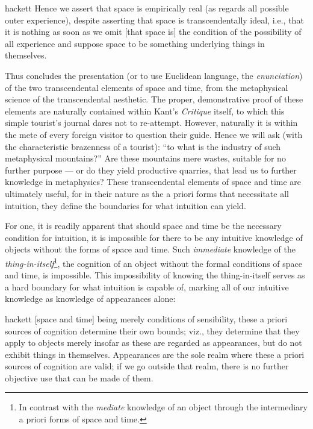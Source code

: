 \begin{displaycquote}[B45]{hackett}
Hence we assert that space is empirically real (as regards all possible outer experience), despite asserting that space is transcendentally ideal, i.e., that it is nothing as soon as we omit [that space is] the condition of the possibility of all experience and suppose space to be something underlying things in themselves.
\end{displaycquote}

Thus concludes the presentation (or to use Euclidean language, the \emph{enunciation}) of the two transcendental elements of space and time, from the metaphysical science of the transcendental aesthetic. The proper, demonstrative proof of these elements are naturally contained within Kant's \emph{Critique} itself, to which this simple tourist's journal dares not to re-attempt. However, naturally it is within the mete of every foreign visitor to question their guide. Hence we will ask (with the characteristic brazenness of a tourist): \enquote{to what is the industry of such metaphysical mountains?} Are these mountains mere wastes, suitable for no further purpose --- or do they yield productive quarries, that lead us to further knowledge in metaphysics? These transcendental elements of space and time are ultimately useful, for in their nature as the a priori forms that necessitate all intuition, they define the boundaries for what intuition can yield.

For one, it is readily apparent that should space and time be the necessary condition for intuition, it is impossible for there to be any intuitive knowledge of objects without the forms of space and time. Such \emph{immediate} knowledge of the \emph{thing-in-itself}\footnote{In contrast with the \emph{mediate} knowledge of an object through the intermediary a priori forms of space and time.}, the cognition of an object without the formal conditions of space and time, is impossible. This impossibility of knowing the thing-in-itself serves as a hard boundary for what intuition is capable of, marking all of our intuitive knowledge as knowledge of appearances alone:

\begin{displaycquote}[B56]{hackett}
  [space and time] being merely conditions of sensibility, these a priori sources of cognition determine their own bounds; viz., they determine that they apply to objects merely insofar as these are regarded as appearances, but do not exhibit things in themselves. Appearances are the sole realm where these a priori sources of cognition are valid; if we go outside that realm, there is no further objective use that can be made of them.
\end{displaycquote}

